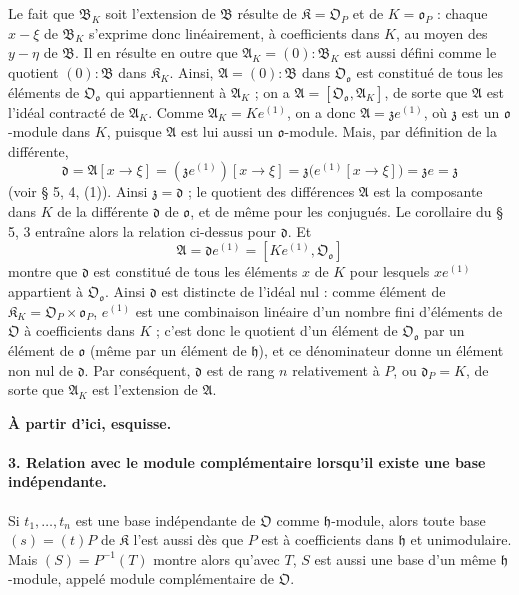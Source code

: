 Le fait que $\mathfrak B_K$ soit l'extension de $\mathfrak B$ résulte de $\mathfrak K=\mathfrak O_P$ et de $K=\mathfrak o_P$ : chaque $x-\xi$ de $\mathfrak B_K$ s'exprime donc linéairement, à coefficients dans $K$, au moyen des $y-\eta$ de $\mathfrak B$. Il en résulte en outre que $\mathfrak A_K=(0):\mathfrak B_K$ est aussi défini comme le quotient $(0):\mathfrak B$ dans $\mathfrak K_K$. Ainsi, $\mathfrak A=(0):\mathfrak B$ dans $\mathfrak O_{\mathfrak o}$ est constitué de tous les éléments de $\mathfrak O_{\mathfrak o}$ qui appartiennent à $\mathfrak A_K$ ; on a $\mathfrak A=[\mathfrak O_{\mathfrak o},\mathfrak A_K]$, de sorte que $\mathfrak A$ est l'idéal contracté de $\mathfrak A_K$. Comme $\mathfrak A_K=Ke^{(1)}$, on a donc $\mathfrak A=\mathfrak z e^{(1)}$, où $\mathfrak z$ est un $\mathfrak o$-module dans $K$, puisque $\mathfrak A$ est lui aussi un $\mathfrak o$-module. Mais, par définition de la différente,
\[
\mathfrak d=\mathfrak A[x\to\xi]
=(\mathfrak z e^{(1)})[x\to\xi]
=\mathfrak z\bigl(e^{(1)}[x\to\xi]\bigr)=\mathfrak z e=\mathfrak z
\]
(voir \S{} 5, 4, (1)). Ainsi $\mathfrak z=\mathfrak d$ ; le quotient des différences $\mathfrak A$ est la composante dans $K$ de la différente $\mathfrak d$ de $\mathfrak o$, et de même pour les conjugués. Le corollaire du \S{} 5, 3 entraîne alors la relation ci-dessus pour $\mathfrak d$. Et
\[
\mathfrak A=\mathfrak d e^{(1)}=[Ke^{(1)},\mathfrak O_{\mathfrak o}]
\]
montre que $\mathfrak d$ est constitué de tous les éléments $x$ de $K$ pour lesquels $xe^{(1)}$ appartient à $\mathfrak O_{\mathfrak o}$. Ainsi $\mathfrak d$ est distincte de l'idéal nul : comme élément de $\mathfrak K_K=\mathfrak O_P\times\mathfrak o_P$, $e^{(1)}$ est une combinaison linéaire d'un nombre fini d'éléments de $\mathfrak O$ à coefficients dans $K$ ; c'est donc le quotient d'un élément de $\mathfrak O_{\mathfrak o}$ par un élément de $\mathfrak o$ (même par un élément de $\mathfrak h$), et ce dénominateur donne un élément non nul de $\mathfrak d$. Par conséquent, $\mathfrak d$ est de rang $n$ relativement à $P$, ou $\mathfrak d_P=K$, de sorte que $\mathfrak A_K$ est l'extension de $\mathfrak A$.

\begin{center}
\textbf{À partir d'ici, esquisse.}
\end{center}

\paragraph{3. Relation avec le module complémentaire lorsqu'il existe une base indépendante.}
Si $t_1,\ldots,t_n$ est une base indépendante de $\mathfrak O$ comme $\mathfrak h$-module, alors toute base $(s)=(t)P$ de $\mathfrak K$ l'est aussi dès que $P$ est à coefficients dans $\mathfrak h$ et unimodulaire. Mais $(S)=P^{-1}(T)$ montre alors qu'avec $T$, $S$ est aussi une base d'un même $\mathfrak h$-module, appelé module complémentaire de $\mathfrak O$.

